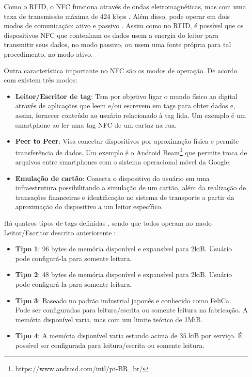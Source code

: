Como o RFID, o NFC funciona através de ondas eletromagnéticas, mas com uma taxa de transmissão máxima de 424 kbps \cite{NFCForum2016}. Além disso, pode operar em dois modos de comunicação: ativo e passivo  \cite{Igoe2014}. Assim como no RFID, é possível que os dispositivos NFC que contenham os dados usem a energia do leitor para transmitir seus dados, no modo passivo, ou usem uma fonte própria para tal procedimento, no modo ativo.


Outra característica importante no NFC são os modos de operação. De acordo com  existem três modos:

\begin{itemize} \parskip -4pt
	\item \textbf{Leitor/Escritor de tag}: Tem por objetivo ligar o mundo físico ao digital através 
	de aplicações que leem e/ou escrevem em tags para obter dados e, assim, fornecer conteúdo ao 
	usuário relacionado à tag lida. Um exemplo é um smartphone ao ler uma tag NFC de um cartaz na 
	rua.
	\item \textbf{Peer to Peer}: Visa conectar dispositivos por aproximação física e permite transferência de dados. Um exemplo é o Android Beam\textsuperscript{\textregistered}\footnote{https://www.android.com/intl/pt-BR\_br/} que permite troca de arquivos entre smartphones com o 
	sistema operacional móvel da Google.
	\item \textbf{Emulação de cartão}: Conecta o dispositivo do usuário em uma infraestrutura 
	possibilitando a simulação de um cartão, além da realização de transações financeiras e 
	identificação no sistema de transporte a partir da aproximação do dispositivo a um leitor 
	específico.
\end{itemize}

Há quatros tipos de tags definidas \cite{NFCForum2016a}, sendo que todos operam no modo Leitor/Escritor descrito anteriorente : 

\begin{itemize} \parskip -4pt
	\item \textbf{Tipo 1}: 96 bytes de memória disponível e expansível para 2kiB. Usuário pode 
	configurá-la para somente leitura.
	\item \textbf{Tipo 2}: 48 bytes de memória disponível e expansível para 2kiB. Usuário pode 
	configurá-la para somente leitura.
	\item \textbf{Tipo 3}: Baseado no padrão industrial japonês e conhecido como FeliCa. Pode ser 
	configuradas para leitura/escrita ou somente leitura na fabricação. A memória disponível varia, 
	mas com um limite teórico de 1MiB.
	\item \textbf{Tipo 4}: A memória disponível varia estando acima de 35 kiB por serviço. É 
	possível ser configurada para leitura/escrita ou somente leitura.
\end{itemize}

